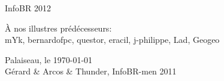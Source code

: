 \thispagestyle{empty}

\begin{center}
\begin{Huge}
InfoBR 2012
\end{Huge}
\end{center}


\begin{flushright}
\begin{large}
 { \selectfont
\`A nos illustres pr\'ed\'ecesseurs:\\
\smallskip
mYk, bernardofpc, questor, eracil, j-philippe, Lad, Geogeo \\ }
\end{large}
\vspace{1cm}
{Palaiseau, le \today \\
\medskip
G\'erard \& Arcos \& Thunder, InfoBR-men 2011  }
\end{flushright}



\newpage
\thispagestyle{empty}
\vspace*{1cm}
\newpage
